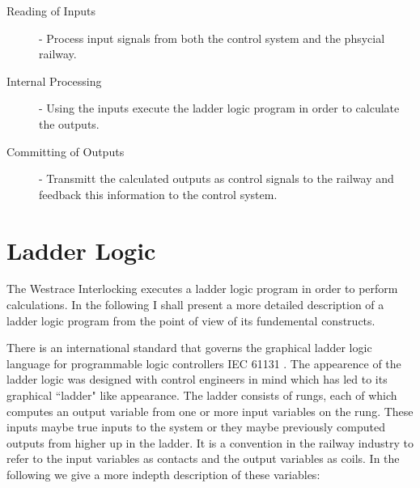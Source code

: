 \begin{description}

\item[Reading of Inputs] - Process input signals from both the control system and the phsycial railway.

\item[Internal Processing] - Using the inputs execute the ladder logic program in order to calculate the outputs. 

\item[Committing of Outputs] - Transmitt the calculated outputs as control signals to the railway and feedback this information to the control system.

\end{description}




\section{Ladder Logic}

The Westrace Interlocking executes a ladder logic program \cite{IEC03} in order to perform calculations. In the following I shall present a more detailed description of a ladder logic program from the point of view of its fundemental constructs.  

\begin{comment}
The Westrace Interlocking performs calculations by executing a ladder logic
program \cite{IEC03}. In the following we will look in more detail at these
ladder logic programs. The main concepts behind their construction and
behaviour will be presented. In later chapters we will provide a formal framework
for the verification of these programs.
\end{comment}

There is an international standard that governs the graphical  ladder logic language for programmable logic controllers IEC 61131 \cite{IEC03}. The appearence of the ladder logic was designed with control engineers in mind which has led to its graphical ``ladder" like appearance. The ladder consists of rungs, each of which computes an output variable from one or more input variables on the rung. These inputs maybe true inputs to the system or they maybe previously computed outputs from higher up in the ladder.  It is a convention in the railway industry to refer to the input variables as contacts and the output variables as coils. In the following we give a more indepth description of these variables:

